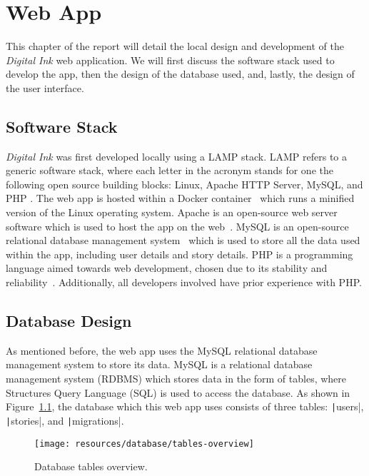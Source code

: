 \chapter{Web App}\label{ch:web-app}

This chapter of the report will detail the local design and development of the \textit{Digital Ink} web application.
We will first discuss the software stack used to develop the app, then the design of the database used, and, lastly, the design of the user interface.

\section{Software Stack}\label{sec:stack}

\textit{Digital Ink} was first developed locally using a LAMP stack.
LAMP refers to a generic software stack, where each letter in the acronym stands for one the following open source building blocks: Linux, Apache HTTP Server, MySQL, and PHP \parencite{lee2003open}.
The web app is hosted within a Docker container~\parencite{anderson2015docker} which runs a minified version of the Linux operating system.
Apache is an open-source web server software which is used to host the app on the web~\parencite{fielding1997apache}.
MySQL is an open-source relational database management system~\parencite{widenius2002mysql} which is used to store all the data used within the app, including user details and story details.
PHP is a programming language aimed towards web development, chosen due to its stability and reliability~\parencite{lerdorf2002programming}.
Additionally, all developers involved have prior experience with PHP\@.

\section{Database Design}\label{sec:database}

As mentioned before, the web app uses the MySQL relational database management system to store its data.
MySQL is a relational database management system (RDBMS) which stores data in the form of tables, where Structures Query Language (SQL) is used to access the database.
As shown in Figure~\ref{fig:tables-overview}, the database which this web app uses consists of three tables: \texttt|users|, \texttt|stories|, and \texttt|migrations|.

\begin{figure}[!htbp]
    \centering
    \texttt{[image: resources/database/tables-overview]}
    \caption{Database tables overview.}
    \label{fig:tables-overview}
\end{figure}

